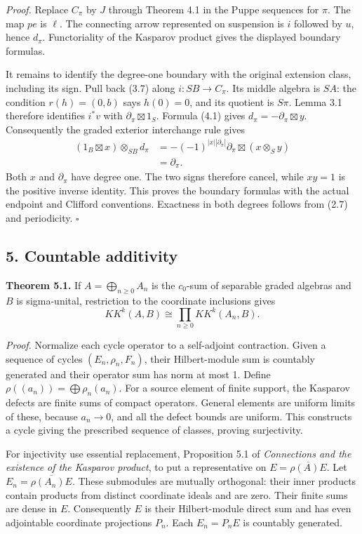 \documentclass[
  11pt,
]{article}
\begin{document}
\emph{Proof.} Replace \(C_\pi\) by \(J\) through Theorem 4.1 in the
Puppe sequences for \(\pi\). The map \(p e\) is \(\ell\). The connecting
arrow represented on suspension is \(i\) followed by \(u\), hence
\(d_\pi\). Functoriality of the Kasparov product gives the displayed
boundary formulas.

It remains to identify the degree-one boundary with the original
extension class, including its sign. Pull back (3.7) along
\(i:SB\to C_\pi\). Its middle algebra is \(SA\): the condition
\(r(h)=(0,b)\) says \(h(0)=0\), and its quotient is \(S\pi\). Lemma 3.1
therefore identifies \(i^*v\) with \(\partial_\pi\boxtimes1_S\). Formula
(4.1) gives \(d_\pi=-\partial_\pi\boxtimes y\). Consequently the graded
exterior interchange rule gives \[
\begin{aligned}
(1_B\boxtimes x)\otimes_{SB}d_\pi
&=-(-1)^{|x||\partial_\pi|}
  \partial_\pi\boxtimes(x\otimes_S y)\\
&=\partial_\pi .
\end{aligned}
\tag{4.7}
\] Both \(x\) and \(\partial_\pi\) have degree one. The two signs
therefore cancel, while \(xy=1\) is the positive inverse identity. This
proves the boundary formulas with the actual endpoint and Clifford
conventions. Exactness in both degrees follows from (2.7) and
periodicity. \(\square\)

\subsection{5. Countable additivity}\label{countable-additivity}

\textbf{Theorem 5.1.} If \(A=\bigoplus_{n\ge0}A_n\) is the \(c_0\)-sum
of separable graded algebras and \(B\) is sigma-unital, restriction to
the coordinate inclusions gives \[
KK^k(A,B)\cong\prod_{n\ge0}KK^k(A_n,B).
\tag{5.1}
\]

\emph{Proof.} Normalize each cycle operator to a self-adjoint
contraction. Given a sequence of cycles \((E_n,\rho_n,F_n)\), their
Hilbert-module sum is countably generated and their operator sum has
norm at most 1. Define \(\rho((a_n))=\bigoplus\rho_n(a_n)\). For a
source element of finite support, the Kasparov defects are finite sums
of compact operators. General elements are uniform limits of these,
because \(a_n\to0\), and all the defect bounds are uniform. This
constructs a cycle giving the prescribed sequence of classes, proving
surjectivity.

For injectivity use essential replacement, Proposition 5.1 of
\emph{Connections and the existence of the Kasparov product}, to put a
representative on \(E=\overline{\rho(A)E}\). Let
\(E_n=\overline{\rho(A_n)E}\). These submodules are mutually orthogonal:
their inner products contain products from distinct coordinate ideals
and are zero. Their finite sums are dense in \(E\). Consequently \(E\)
is their Hilbert-module direct sum and has even adjointable coordinate
projections \(P_n\). Each \(E_n=P_nE\) is countably generated.
\end{document}

